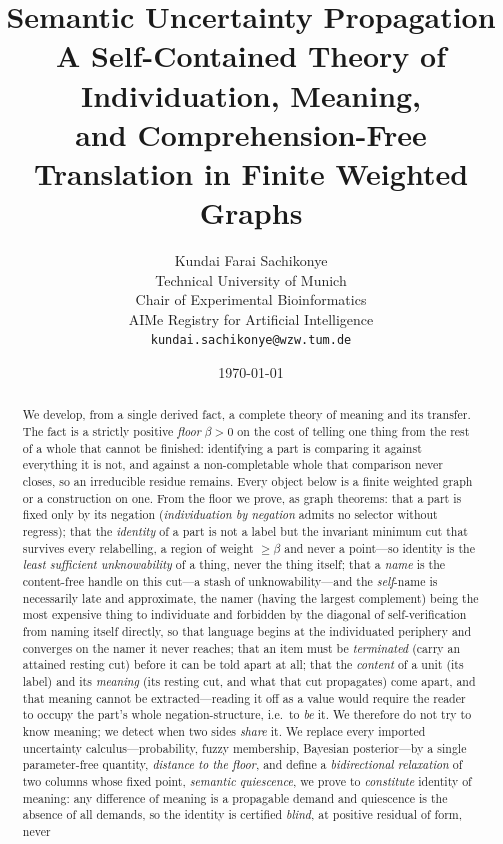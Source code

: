 \documentclass[twocolumn,11pt,a4paper]{article}
\title{\textbf{Semantic Uncertainty Propagation}\\[3pt]
\large A Self-Contained Theory of Individuation, Meaning,\\
and Comprehension-Free Translation in Finite Weighted Graphs}
\author{%
Kundai Farai Sachikonye\\[2pt]
\small Technical University of Munich\\
\small Chair of Experimental Bioinformatics\\
\small AIMe Registry for Artificial Intelligence\\
\small \texttt{kundai.sachikonye@wzw.tum.de}}
\date{\today}
\theoremstyle{sup}
\theoremstyle{definition}
\theoremstyle{remark}
\newcommand{\flo}{\beta}
\begin{document}
\maketitle

\begin{abstract}
\noindent
We develop, from a single derived fact, a complete theory of meaning and its
transfer. The fact is a strictly positive \emph{floor} $\flo>0$ on the cost of
telling one thing from the rest of a whole that cannot be finished: identifying
a part is comparing it against everything it is not, and against a
non-completable whole that comparison never closes, so an irreducible residue
remains. Every object below is a finite weighted graph or a construction on
one. From the floor we prove, as graph theorems: that a part is fixed only by
its negation (\emph{individuation by negation} admits no selector without
regress); that the \emph{identity} of a part is not a label but the invariant
minimum cut that survives every relabelling, a region of weight $\ge\flo$ and
never a point---so identity is the \emph{least sufficient unknowability} of a
thing, never the thing itself; that a \emph{name} is the content-free handle on
this cut---a stash of unknowability---and the \emph{self}-name is necessarily late
and approximate, the namer (having the largest complement) being the most expensive
thing to individuate and forbidden by the diagonal of self-verification from naming
itself directly, so that language begins at the individuated periphery and converges
on the namer it never reaches; that an item must be \emph{terminated} (carry an
attained resting cut) before it can be told apart at all; that the \emph{content}
of a unit (its label) and its \emph{meaning} (its resting cut, and what that
cut propagates) come apart, and that meaning cannot be extracted---reading it
off as a value would require the reader to occupy the part's whole
negation-structure, i.e.\ to \emph{be} it. We therefore do not try to know
meaning; we detect when two sides \emph{share} it. We replace every imported
uncertainty calculus---probability, fuzzy membership, Bayesian posterior---by a
single parameter-free quantity, \emph{distance to the floor}, and define a
\emph{bidirectional relaxation} of two columns whose fixed point, \emph{semantic
quiescence}, we prove to \emph{constitute} identity of meaning: any difference
of meaning is a propagable demand and quiescence is the absence of all demands,
so the identity is certified \emph{blind}, at positive residual of form, never

\end{abstract}
\end{document}
